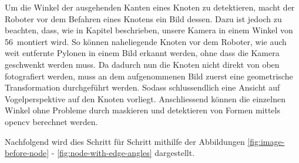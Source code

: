 Um die Winkel der ausgehenden Kanten eines Knoten zu detektieren, macht der Roboter vor dem Befahren eines Knotens ein Bild dessen. Dazu ist jedoch zu beachten, dass, wie in Kapitel  beschrieben, unsere Kamera in einem Winkel von 56\textdegree\ montiert wird. So können naheliegende Knoten vor dem Roboter, wie auch weit entfernte Pylonen in einem Bild erkannt werden, ohne dass die Kamera geschwenkt werden muss.
Da dadurch nun die Knoten nicht direkt von oben fotografiert werden, muss an dem aufgenommenen Bild zuerst eine geometrische Transformation durchgeführt werden. Sodass schlussendlich eine Ansicht auf Vogelperspektive auf den Knoten vorliegt. Anschliessend können die einzelnen Winkel ohne Probleme durch maskieren und detektieren von Formen mittels \gls{opencv} berechnet werden.

Nachfolgend wird dies Schritt für Schritt mithilfe der Abbildungen \ref{fig:image-before-node} - \ref{fig:node-with-edge-angles} dargestellt.

